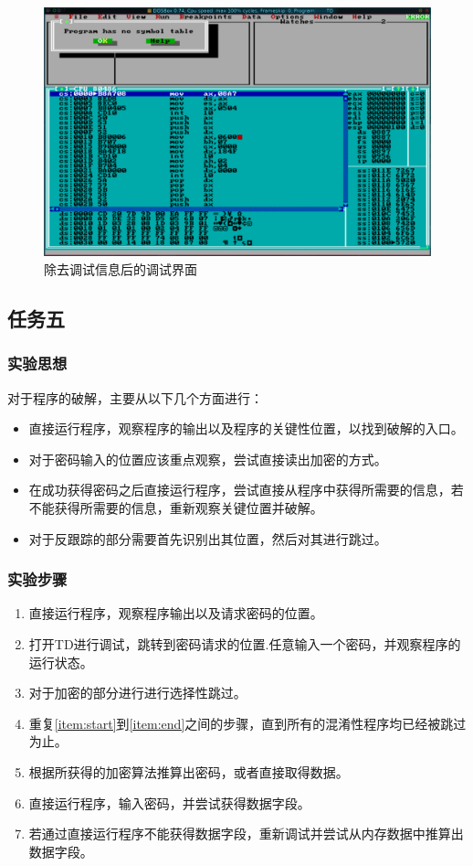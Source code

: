 \documentclass{article}
\begin{document}
\begin{enumerate}
			\begin{figure}[H]
				\centering
				\includegraphics[width=0.85\linewidth]{res/homework_4/nodebug.png}
				\caption{除去调试信息后的调试界面}
				\label{fig:nodebug}
			\end{figure}
	\end{enumerate}

	\subsection{任务五}
	\subsubsection{实验思想}
	对于程序的破解，主要从以下几个方面进行：
	\begin{itemize}
		\item 直接运行程序，观察程序的输出以及程序的关键性位置，以找到破解的入口。
		\item 对于密码输入的位置应该重点观察，尝试直接读出加密的方式。
		\item 在成功获得密码之后直接运行程序，尝试直接从程序中获得所需要的信息，若不能获得所需要的信息，重新观察关键位置并破解。
		\item 对于反跟踪的部分需要首先识别出其位置，然后对其进行跳过。
	\end{itemize}

	\subsubsection{实验步骤}
	\begin{enumerate}
		\item 直接运行程序，观察程序输出以及请求密码的位置。
		\item \label{item:start}打开TD进行调试，跳转到密码请求的位置.任意输入一个密码，并观察程序的运行状态。
		\item \label{item:end}对于加密的部分进行进行选择性跳过。
		\item 重复\ref{item:start}到\ref{item:end}之间的步骤，直到所有的混淆性程序均已经被跳过为止。
		\item 根据所获得的加密算法推算出密码，或者直接取得数据。
		\item 直接运行程序，输入密码，并尝试获得数据字段。
		\item 若通过直接运行程序不能获得数据字段，重新调试并尝试从内存数据中推算出数据字段。
	\end{enumerate}
\end{document}
